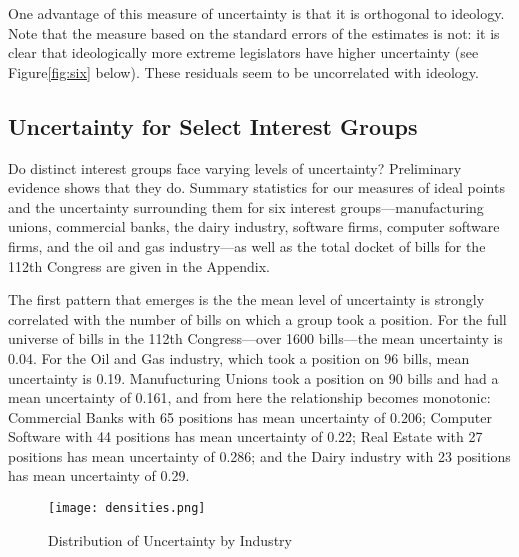 \documentclass[12pt]{article}
\begin{document}
One advantage of this measure of uncertainty is that it is orthogonal to ideology. Note that the measure based on the standard errors of the estimates is not: it is clear that ideologically more extreme legislators have higher uncertainty (see Figure\ref{fig:six} below). These residuals seem to be uncorrelated with ideology.





\subsection{Uncertainty for Select Interest Groups}
\label{sec:select}
Do distinct interest groups face varying levels of uncertainty? Preliminary evidence shows that they do. Summary statistics for our measures of ideal points and the uncertainty surrounding them for six interest groups---manufacturing unions, commercial banks, the dairy industry, software firms, computer software firms, and the oil and gas industry---as well as the total docket of bills for the 112th Congress are given in the Appendix.

The first pattern that emerges is the the mean level of uncertainty is strongly correlated with the number of bills on which a group took a position. For the full universe of bills in the 112th Congress---over 1600 bills---the mean uncertainty is 0.04. For the Oil and Gas industry, which took a position on 96 bills, mean uncertainty is 0.19. Manufucturing Unions took a position on 90 bills and had a mean uncertainty of 0.161, and from here the relationship becomes monotonic: Commercial Banks with 65 positions has mean uncertainty of 0.206; Computer Software with 44 positions has mean uncertainty of 0.22; Real Estate with 27 positions has mean uncertainty of 0.286; and the Dairy industry with 23 positions has mean uncertainty of 0.29.

\begin{figure}
\begin{center}
\texttt{[image: densities.png]}
\end{center}
\caption{Distribution of Uncertainty by Industry\label{fig:den}}
\end{figure}
\end{document}
